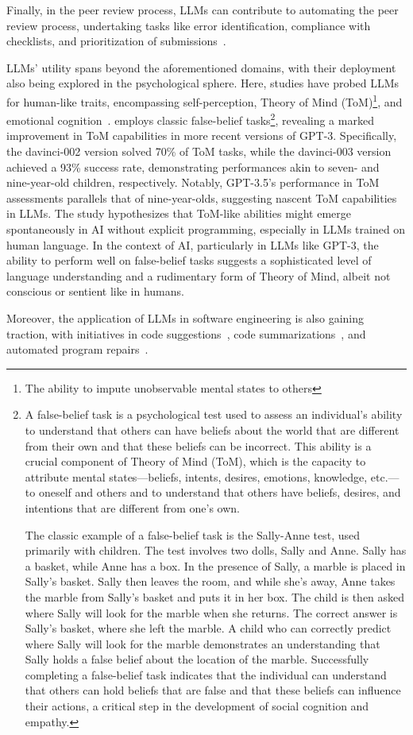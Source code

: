 Finally, in the peer review process, LLMs can contribute to automating the peer review process, undertaking tasks like error identification, compliance with checklists, and prioritization of submissions~\cite{liu2023reviewergpt}.

LLMs' utility spans beyond the aforementioned domains, with their deployment also being explored in the psychological sphere.
Here, studies have probed LLMs for human-like traits, encompassing self-perception, Theory of Mind (ToM)\footnote{The ability to impute unobservable mental states to others}, and emotional cognition~\cite{kosinski2023theoryofmind, amin2023affectivecomputing}.
\textcite{kosinski2023theoryofmind} employs classic false-belief tasks\footnote{A false-belief task is a psychological test used to assess an individual's ability to understand that others can have beliefs about the world that are different from their own and that these beliefs can be incorrect. This ability is a crucial component of Theory of Mind (ToM), which is the capacity to attribute mental states—beliefs, intents, desires, emotions, knowledge, etc.—to oneself and others and to understand that others have beliefs, desires, and intentions that are different from one's own.

	The classic example of a false-belief task is the Sally-Anne test, used primarily with children. The test involves two dolls, Sally and Anne. Sally has a basket, while Anne has a box. In the presence of Sally, a marble is placed in Sally's basket. Sally then leaves the room, and while she's away, Anne takes the marble from Sally's basket and puts it in her box. The child is then asked where Sally will look for the marble when she returns. The correct answer is Sally's basket, where she left the marble. A child who can correctly predict where Sally will look for the marble demonstrates an understanding that Sally holds a false belief about the location of the marble.
	Successfully completing a false-belief task indicates that the individual can understand that others can hold beliefs that are false and that these beliefs can influence their actions, a critical step in the development of social cognition and empathy.}, revealing a marked improvement in ToM capabilities in more recent versions of GPT-3.
Specifically, the davinci-002 version solved 70\% of ToM tasks, while the davinci-003 version achieved a 93\% success rate, demonstrating performances akin to seven- and nine-year-old children, respectively.
Notably, GPT-3.5's performance in ToM assessments parallels that of nine-year-olds, suggesting nascent ToM capabilities in LLMs.
The study hypothesizes that ToM-like abilities might emerge spontaneously in AI without explicit programming, especially in LLMs trained on human language.
In the context of AI, particularly in LLMs like GPT-3, the ability to perform well on false-belief tasks suggests a sophisticated level of language understanding and a rudimentary form of Theory of Mind, albeit not conscious or sentient like in humans.

Moreover, the application of LLMs in software engineering is also gaining traction, with initiatives in code suggestions~\cite{sridhara2023chatgptsoftware}, code summarizations~\cite{sun2023code}, and automated program repairs~\cite{xia2023conversationalrepair}.